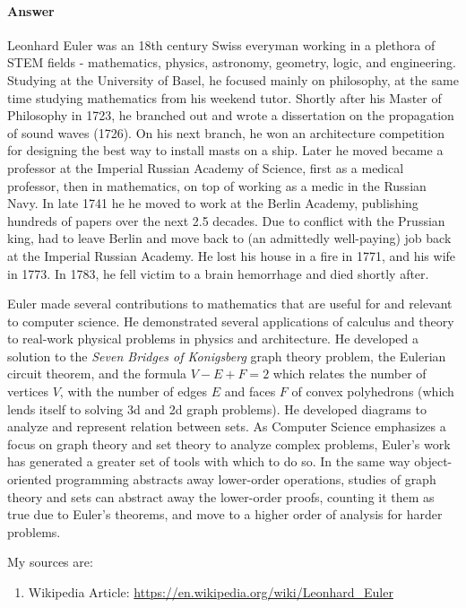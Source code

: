 \documentclass{article}
\begin{document}
\paragraph{Answer}

Leonhard Euler was an 18th century Swiss everyman working in a plethora of STEM fields - mathematics, physics, astronomy, geometry, logic, and engineering. Studying at the University of Basel, he focused mainly on philosophy, at the same time studying mathematics from his weekend tutor. Shortly after his Master of Philosophy in 1723, he branched out and wrote a dissertation on the propagation of sound waves (1726). On his next branch, he won an architecture competition for designing the best way to install masts on a ship. Later he moved became a professor at the Imperial Russian Academy of Science, first as a medical professor, then in mathematics, on top of working as a medic in the Russian Navy. In late 1741 he he moved to work at the Berlin Academy, publishing hundreds of papers over the next 2.5 decades. Due to conflict with the Prussian king, had to leave Berlin and move back to (an admittedly well-paying) job back at the Imperial Russian Academy. He lost his house in a fire in 1771, and his wife in 1773. In 1783, he fell victim to a brain hemorrhage and died shortly after.

Euler made several contributions to mathematics that are useful for and relevant to computer science. He demonstrated several applications of calculus and theory to real-work physical problems in physics and architecture. He developed a solution to the \emph{Seven Bridges of Konigsberg} graph theory problem, the Eulerian circuit theorem, and the formula $V - E + F = 2$ which relates the number of vertices $V$, with the number of edges $E$ and faces $F$ of convex polyhedrons (which lends itself to solving 3d and 2d graph problems). He developed diagrams to analyze and represent relation between sets. As Computer Science emphasizes a focus on graph theory and set theory to analyze complex problems, Euler's work has generated a greater set of tools with which to do so. In the same way object-oriented programming abstracts away lower-order operations, studies of graph theory and sets can abstract away the lower-order proofs, counting it them as true due to Euler's theorems, and move to a higher order of analysis for harder problems.

My sources are:
\begin{enumerate}
        \item Wikipedia Article: \url{https://en.wikipedia.org/wiki/Leonhard_Euler}
\end{enumerate}

%
%
\end{document}
